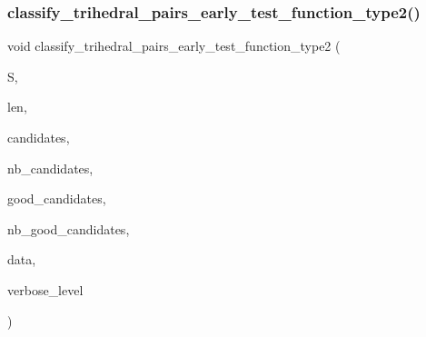 \subsubsection{\texorpdfstring{classify\+\_\+trihedral\+\_\+pairs\+\_\+early\+\_\+test\+\_\+function\+\_\+type2()}{classify\_trihedral\_pairs\_early\_test\_function\_type2()}}
{\footnotesize\ttfamily void classify\+\_\+trihedral\+\_\+pairs\+\_\+early\+\_\+test\+\_\+function\+\_\+type2 (\begin{DoxyParamCaption}\item[{\mbox{\hyperlink{galois_8h_a09fddde158a3a20bd2dcadb609de11dc}{I\+NT}} $\ast$}]{S,  }\item[{\mbox{\hyperlink{galois_8h_a09fddde158a3a20bd2dcadb609de11dc}{I\+NT}}}]{len,  }\item[{\mbox{\hyperlink{galois_8h_a09fddde158a3a20bd2dcadb609de11dc}{I\+NT}} $\ast$}]{candidates,  }\item[{\mbox{\hyperlink{galois_8h_a09fddde158a3a20bd2dcadb609de11dc}{I\+NT}}}]{nb\+\_\+candidates,  }\item[{\mbox{\hyperlink{galois_8h_a09fddde158a3a20bd2dcadb609de11dc}{I\+NT}} $\ast$}]{good\+\_\+candidates,  }\item[{\mbox{\hyperlink{galois_8h_a09fddde158a3a20bd2dcadb609de11dc}{I\+NT}} \&}]{nb\+\_\+good\+\_\+candidates,  }\item[{void $\ast$}]{data,  }\item[{\mbox{\hyperlink{galois_8h_a09fddde158a3a20bd2dcadb609de11dc}{I\+NT}}}]{verbose\+\_\+level }\end{DoxyParamCaption})}

